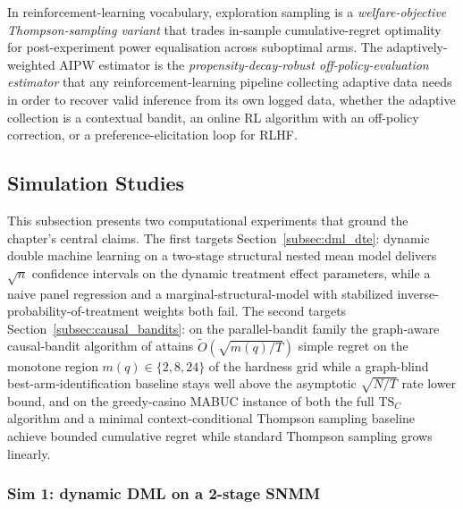In reinforcement-learning vocabulary, exploration sampling is a \emph{welfare-objective Thompson-sampling variant} that trades in-sample cumulative-regret optimality for post-experiment power equalisation across suboptimal arms. The adaptively-weighted AIPW estimator is the \emph{propensity-decay-robust off-policy-evaluation estimator} that any reinforcement-learning pipeline collecting adaptive data needs in order to recover valid inference from its own logged data, whether the adaptive collection is a contextual bandit, an online RL algorithm with an off-policy correction, or a preference-elicitation loop for RLHF.

\subsection{Simulation Studies}
\label{subsec:simstudy}

This subsection presents two computational experiments that ground the chapter's central claims. The first targets Section~\ref{subsec:dml_dte}: dynamic double machine learning on a two-stage structural nested mean model delivers $\sqrt n$ confidence intervals on the dynamic treatment effect parameters, while a naive panel regression and a marginal-structural-model with stabilized inverse-probability-of-treatment weights both fail. The second targets Section~\ref{subsec:causal_bandits}: on the parallel-bandit family the graph-aware causal-bandit algorithm of \citet{lattimore2016causal} attains $\tilde O(\sqrt{m(q)/T})$ simple regret on the monotone region $m(q) \in \{2, 8, 24\}$ of the hardness grid while a graph-blind best-arm-identification baseline stays well above the asymptotic $\sqrt{N/T}$ rate lower bound, and on the greedy-casino MABUC instance of \citet{bareinboim2015mabuc} both the full $\mathrm{TS}_C$ algorithm and a minimal context-conditional Thompson sampling baseline achieve bounded cumulative regret while standard Thompson sampling grows linearly.

\subsubsection*{Sim 1: dynamic DML on a 2-stage SNMM}

